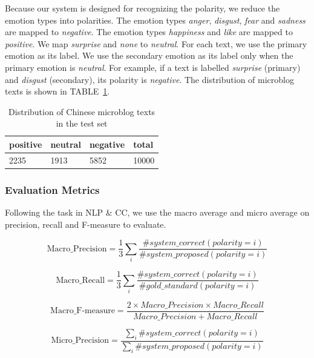 Because our system is designed for recognizing the polarity, we reduce the emotion types into polarities. The emotion types {\it anger}, {\it disgust}, {\it fear} and {\it sadness} are mapped to {\it negative}. The emotion types {\it happiness} and {\it like} are mapped to {\it positive}. We map {\it surprise} and {\it none} to {\it neutral}. For each text, we use the primary emotion as its label. We use the secondary emotion as its label only when the primary emotion is {\it neutral}. For example, if a text is labelled {\it surprise} (primary) and {\it disgust} (secondary), its polarity is {\it negative}. The distribution of microblog texts is shown in TABLE~\ref{table:microblogDist}.

\begin{table}[!t]
\centering
\caption{Distribution of Chinese microblog texts in the test set}
\label{table:microblogDist}
\begin{tabular}{|l|l|l|l|}
\hline
positive & neutral & negative & total \\ \hline
2235 & 1913 & 5852 & 10000  \\ \hline
\end{tabular}
\end{table} 

\subsubsection{Evaluation Metrics}
Following the task in NLP \& CC, we use the macro average and micro average on precision, recall and F-measure to evaluate.

\begin{equation}
\label{eq:macroPrec}
\text{Macro\_Precision} = \frac{1}{3} \sum_{i} \frac{\#system\_correct(polarity=i)}{\#system\_proposed(polarity=i)}
\end{equation}

\begin{equation}
\label{eq:macroRecall}
\text{Macro\_Recall} = \frac{1}{3} \sum_{i} \frac{\#system\_correct(polarity=i)}{\#gold\_standard(polarity=i)}
\end{equation}

\begin{equation}
\label{eq:macroF}
\text{Macro\_F-measure} = \frac{2 \times Macro\_Precision \times Macro\_Recall}{Macro\_Precision+Macro\_Recall}
\end{equation}

\begin{equation}
\label{eq:microPrec}
\text{Micro\_Precision} = \frac{\sum_{i}\#system\_correct(polarity=i)}{\sum_{i}\#system\_proposed(polarity=i)}
\end{equation}

